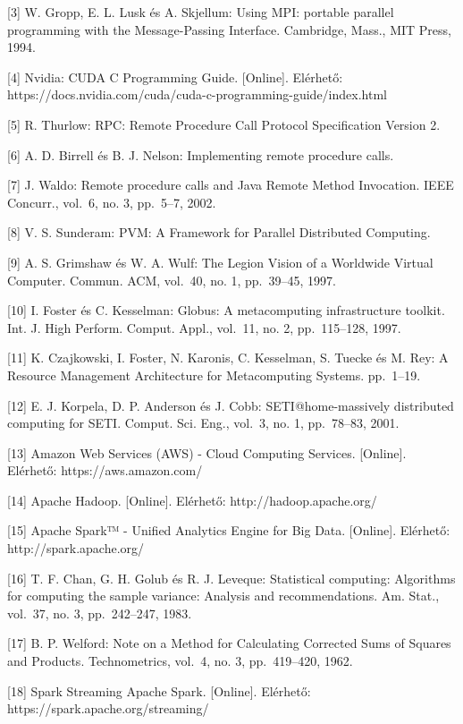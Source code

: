 \documentclass[
]{article}
\begin{document}
{[}3{]} W. Gropp, E. L. Lusk és A. Skjellum: Using MPI: portable
parallel programming with the Message-Passing Interface. Cambridge,
Mass., MIT Press, 1994.

{[}4{]} Nvidia: CUDA C Programming Guide. {[}Online{]}. Elérhető:
https://docs.nvidia.com/cuda/cuda-c-programming-guide/index.html

{[}5{]} R. Thurlow: RPC: Remote Procedure Call Protocol Specification
Version 2.

{[}6{]} A. D. Birrell és B. J. Nelson: Implementing remote procedure
calls.

{[}7{]} J. Waldo: Remote procedure calls and Java Remote Method
Invocation. IEEE Concurr., vol.~6, no. 3, pp.~5--7, 2002.

{[}8{]} V. S. Sunderam: PVM: A Framework for Parallel Distributed
Computing.

{[}9{]} A. S. Grimshaw és W. A. Wulf: The Legion Vision of a Worldwide
Virtual Computer. Commun. ACM, vol.~40, no. 1, pp.~39--45, 1997.

{[}10{]} I. Foster és C. Kesselman: Globus: A metacomputing
infrastructure toolkit. Int. J. High Perform. Comput. Appl., vol.~11,
no. 2, pp.~115--128, 1997.

{[}11{]} K. Czajkowski, I. Foster, N. Karonis, C. Kesselman, S. Tuecke
és M. Rey: A Resource Management Architecture for Metacomputing Systems.
pp.~1--19.

{[}12{]} E. J. Korpela, D. P. Anderson és J. Cobb: SETI@home-massively
distributed computing for SETI. Comput. Sci. Eng., vol.~3, no. 1,
pp.~78--83, 2001.

{[}13{]} Amazon Web Services (AWS) - Cloud Computing Services.
{[}Online{]}. Elérhető: https://aws.amazon.com/

{[}14{]} Apache Hadoop. {[}Online{]}. Elérhető:
http://hadoop.apache.org/

{[}15{]} Apache Spark™ - Unified Analytics Engine for Big Data.
{[}Online{]}. Elérhető: http://spark.apache.org/

{[}16{]} T. F. Chan, G. H. Golub és R. J. Leveque: Statistical
computing: Algorithms for computing the sample variance: Analysis and
recommendations. Am. Stat., vol.~37, no. 3, pp.~242--247, 1983.

{[}17{]} B. P. Welford: Note on a Method for Calculating Corrected Sums
of Squares and Products. Technometrics, vol.~4, no. 3, pp.~419--420,
1962.

{[}18{]} Spark Streaming \textbar{} Apache Spark. {[}Online{]}.
Elérhető: https://spark.apache.org/streaming/
\end{document}
